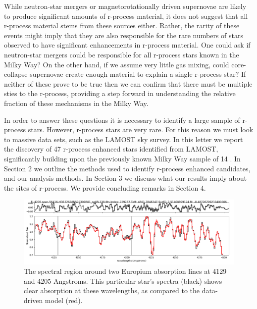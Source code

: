 \documentclass[a4paper,fleqn,usenatbib]{mnras}
\begin{document}
	While neutron-star mergers or magnetorotationally driven supernovae are likely to produce significant amounts of r-process material, it does not suggest that all r-process material stems from these sources either. Rather, the rarity of these events might imply that they are also responsible for the rare numbers of stars  observed to have significant enhancements in r-process material. One could ask if neutron-star mergers could be responsible for all r-process stars known in the Milky Way? On the other hand, if we assume very little gas mixing, could core-collapse supernovae create enough material to explain a single r-process star? If neither of these prove to be true then we can confirm that there must be multiple sties to the r-process, providing a step forward in understanding the relative fraction of these mechanisms in the Milky Way.
	
	In order to answer these questions it is necessary to identify a large sample of r-process stars.
	However, r-process stars are very rare. For this reason we must look to massive data sets, such as the LAMOST sky survey. In this letter we report the discovery of 47 r-process enhanced stars identified from LAMOST, significantly building upon the previously known Milky Way sample of 14 \citep[e.g.,][]{masho2011,Honda2004,Hayek2009,Sneden2003,Ivans2006,Hill2002,Christlieb2004,Wako2010,placo2017}.
	In Section 2 we outline the methods used to identify r-process enhanced candidates, and our analysis methods. In Section 3 we discuss what our results imply about the sites of r-process. We provide concluding remarks in Section 4.
	
	
	\begin{figure}
		\includegraphics[width=\columnwidth]{229257}
		\caption{The spectral region around two Europium absorption lines at 4129 and 4205 Angstroms. This particular star's spectra (black) shows clear absorption at these wavelengths, as compared to the data-driven model (red).}
		\label{fig:starindex_229257}
	\end{figure}
	
\end{document}
